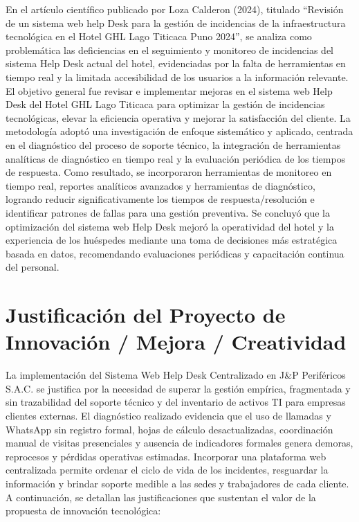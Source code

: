 \vspace{0.8em}

En el artículo científico publicado por Loza Calderon (2024), titulado ``Revisión de un sistema web help Desk para la gestión de incidencias de la infraestructura tecnológica en el Hotel GHL Lago Titicaca Puno 2024'', se analiza como problemática las deficiencias en el seguimiento y monitoreo de incidencias del sistema Help Desk actual del hotel, evidenciadas por la falta de herramientas en tiempo real y la limitada accesibilidad de los usuarios a la información relevante. El objetivo general fue revisar e implementar mejoras en el sistema web Help Desk del Hotel GHL Lago Titicaca para optimizar la gestión de incidencias tecnológicas, elevar la eficiencia operativa y mejorar la satisfacción del cliente. La metodología adoptó una investigación de enfoque sistemático y aplicado, centrada en el diagnóstico del proceso de soporte técnico, la integración de herramientas analíticas de diagnóstico en tiempo real y la evaluación periódica de los tiempos de respuesta. Como resultado, se incorporaron herramientas de monitoreo en tiempo real, reportes analíticos avanzados y herramientas de diagnóstico, logrando reducir significativamente los tiempos de respuesta/resolución e identificar patrones de fallas para una gestión preventiva. Se concluyó que la optimización del sistema web Help Desk mejoró la operatividad del hotel y la experiencia de los huéspedes mediante una toma de decisiones más estratégica basada en datos, recomendando evaluaciones periódicas y capacitación continua del personal.

\section{Justificación del Proyecto de Innovación / Mejora / Creatividad}

La implementación del Sistema Web Help Desk Centralizado en J\&P Periféricos S.A.C. se justifica por la necesidad de superar la gestión empírica, fragmentada y sin trazabilidad del soporte técnico y del inventario de activos TI para empresas clientes externas. El diagnóstico realizado evidencia que el uso de llamadas y WhatsApp sin registro formal, hojas de cálculo desactualizadas, coordinación manual de visitas presenciales y ausencia de indicadores formales genera demoras, reprocesos y pérdidas operativas estimadas. Incorporar una plataforma web centralizada permite ordenar el ciclo de vida de los incidentes, resguardar la información y brindar soporte medible a las sedes y trabajadores de cada cliente. A continuación, se detallan las justificaciones que sustentan el valor de la propuesta de innovación tecnológica:

